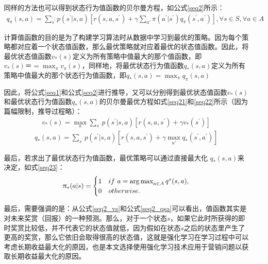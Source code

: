 同样的方法也可以得到状态行为值函数的贝尔曼方程，如公式\eqref{seq2}所示：
\begin{equation}
\label{seq2}
\begin{aligned}
q_{\pi}(s,a)=\sum_{s^{'}}p(s^{'}|s,a)[r(s,a,s^{'})+ \gamma \sum_{a'}\pi(a^{'}|s^{'}) q_{\pi}(s^{'},a^{'})], \forall s \in S, \forall a \in A
\end{aligned}
\end{equation}

计算值函数的目的是为了构建学习算法时从数据中学习到最优的策略。因为每个策略都对应着一个状态值函数，那么最优策略就对应着最优的状态值函数。因此，将最优状态值函数$v_{*}(s)$定义为所有策略中值最大的那个值函数，即$v_{*}(s)＝=\max_{\pi}v_{\pi}(s)$，同样地，将最优状态行为值函数$q_{*}(s,a)$定义为所有策略中值最大的那个状态行为值函数，即$q_{*}(s,a)=\max_{\pi}q_{\pi}(s,a)$

因此，将公式\eqref{seq1}和公式\eqref{seq2}进行推导，又可以分别得到最优状态值函数$v_{*}(s)$和最优状态行为值函数$q_{*}(s,a)$的贝尔曼最优方程如式\eqref{seq21}和\eqref{seq22}所示（因为篇幅限制，推导过程略）：
\begin{equation}\label{seq21}
\begin{aligned}
v_{*}(s)=\max_{a}\sum_{s^{'}}p(s^{'}|s,a)[r(s,a,s^{'})+\gamma v_{*}(s^{'})]
\end{aligned}
\end{equation}
\begin{equation}\label{seq22}
\begin{aligned}
q_{*}(s,a)=\sum_{s^{'}}p(s^{'}|s,a)[r(s,a,s^{'}) +\gamma \max_{a'} q_{*}(s^{'},a^{'})]
\end{aligned}
\end{equation}

最后，若求出了最优状态行为值函数，最优策略可以通过直接最大化 $q_{*}(s,a)$来决定，如式\eqref{seq23}：
\begin{equation}\label{seq23}
\begin{aligned}
\uppi_{*}(a|s) = 
    \begin{cases}
        1 & if \ a=\operatorname*{arg\,max}_{a\in A}{q^{*}(s,a)},\\
        0 & otherwise.
    \end{cases}
\end{aligned}
\end{equation}

最后，需要强调的是：从公式\eqref{seq2_vs}和公式\eqref{seq2_qsa}可以看出，值函数其实是对未来奖赏（回报）的一种预测。那么，对于一个状态$s$，如果它此时所获得的即时奖赏比较低，并不代表它的状态值就低，因为假如在状态$s$之后的状态里产生了更高的奖赏，那么它依旧会取得很高的状态值，这就是强化学习在学习过程中可以考虑长期收益最大化的原因，也是本文选择使用强化学习技术应用于营销问题以获取长期收益最大化的原因。

